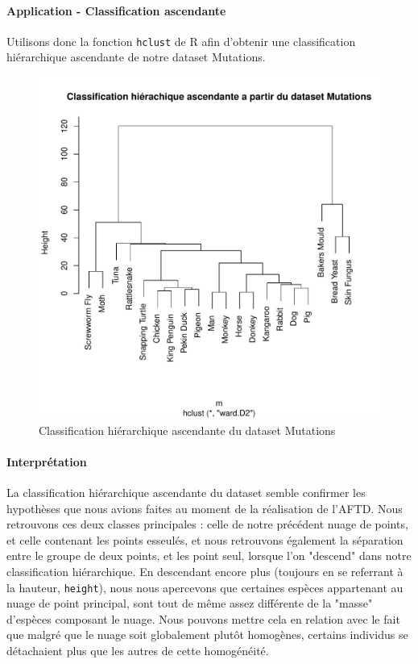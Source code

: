 \documentclass{report}
\begin{document}
\paragraph{Application - Classification ascendante}
Utilisons donc la fonction \verb+hclust+ de R afin d'obtenir une classification hiérarchique ascendante de notre dataset Mutations.
\begin{figure}[ht!]
\begin{center}
    \includegraphics[width=\textwidth]{../plots/E2Q1_CLUSTm.pdf}
    \caption{Classification hiérarchique ascendante du dataset Mutations}
\end{center}
\end{figure}
\newpage
\paragraph{Interprétation}
La classification hiérarchique ascendante du dataset semble confirmer les hypothèses que nous avions faites au moment de la réalisation de l'AFTD. Nous retrouvons ces deux classes principales : celle de notre précédent nuage de points, et celle contenant les points esseulés, et nous retrouvons également la séparation entre le groupe de deux points, et les point seul, lorsque l'on "descend" dans notre classification hiérarchique. En descendant encore plus (toujours en se referrant à la hauteur, \verb+height+), nous nous apercevons que certaines espèces appartenant au nuage de point principal, sont tout de même assez différente de la "masse" d'espèces composant le nuage. Nous pouvons mettre cela en relation avec le fait que malgré que le nuage soit globalement plutôt homogènes, certains individus se détachaient plus que les autres de cette homogénéité.
\newpage
\end{document}

